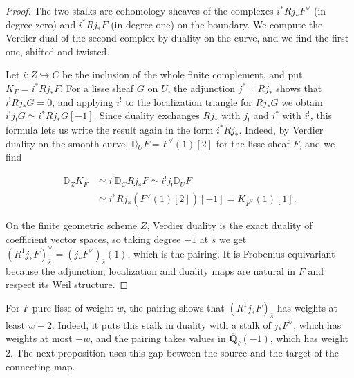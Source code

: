 \documentclass[11pt]{article}
\begin{document}
\begin{proof}[{Proof}]\label{bp24}%
The two stalks are cohomology sheaves of the complexes \(i^*Rj_*F^\vee\) (in degree zero) and \(i^*Rj_*F\) (in degree one) on the boundary. We compute the Verdier dual of the second complex by duality on the curve, and we find the first one, shifted and twisted.

Let \(i:Z\hookrightarrow C\) be the inclusion of the whole finite complement, and put \(K_F=i^*Rj_*F\). For a lisse sheaf \(G\) on \(U\), the adjunction \(j^*\dashv Rj_*\) shows that \(i^!Rj_*G=0\), and applying \(i^!\) to the localization triangle for \(Rj_*G\) we obtain \(i^!j_!G\simeq i^*Rj_*G[-1]\). Since duality exchanges \(Rj_*\) with \(j_!\) and \(i^*\) with \(i^!\), this formula lets us write the result again in the form \(i^*Rj_*\). Indeed, by Verdier duality on the smooth curve, \(\mathbb D_UF=F^\vee(1)[2]\) for the lisse sheaf \(F\), and we find

\[
\begin{split}
\mathbb D_Z K_F
&\simeq i^!\mathbb D_C Rj_*F
\simeq i^!j_!\mathbb D_UF\\
&\simeq i^*Rj_*(F^\vee(1)[2])[-1]
=K_{F^\vee}(1)[1].
\end{split}
\]

On the finite geometric scheme \(Z\), Verdier duality is the exact duality of coefficient vector spaces, so taking degree \(-1\) at \(\bar s\) we get \((R^1j_*F)_{\bar s}^\vee=(j_*F^\vee)_{\bar s}(1)\), which is the pairing. It is Frobenius-equivariant because the adjunction, localization and duality maps are natural in \(F\) and respect its Weil structure.
\end{proof}

\label{bp25}%
For \(F\) pure lisse of weight \(w\), the pairing shows that \((R^1j_*F)_{\bar s}\) has weights at least \(w+2\). Indeed, it puts this stalk in duality with a stalk of \(j_*F^\vee\), which has weights at most \(-w\), and the pairing takes values in \(\overline{\mathbf Q}_\ell(-1)\), which has weight \(2\). The next proposition uses this gap between the source and the target of the connecting map.
\end{document}
